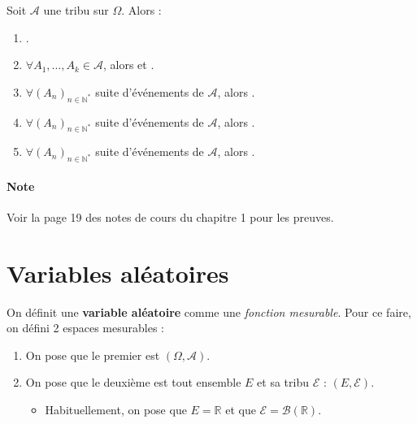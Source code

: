 \documentclass[10pt, french]{report}
\begin{document}
\begin{multicols*}{2}
\begin{definitionNOHFILLprop}
Soit $\mathcal{A}$ une tribu sur $\Omega$. Alors : 
\begin{enumerate}[label = \alph*)]
	\item	{}.
	\item	$\forall A_{1}, \dots, A_{k} \in \mathcal{A}$, alors  et .
	\item	$\forall (A_{n})_{n \in \mathbb{N}^{\ast}}$ suite d'événements de $\mathcal{A}$, alors .
	\item	$\forall (A_{n})_{n \in \mathbb{N}^{\ast}}$ suite d'événements de $\mathcal{A}$, alors .
	\item	$\forall (A_{n})_{n \in \mathbb{N}^{\ast}}$ suite d'événements de $\mathcal{A}$, alors .
\end{enumerate}

\paragraph{Note}	Voir la page 19 des notes de cours du chapitre 1 pour les preuves.
\end{definitionNOHFILLprop}



\columnbreak
\section{Variables aléatoires}

\begin{definitionNOHFILL}
On définit une \textbf{variable aléatoire} comme une \textit{fonction mesurable}. Pour ce faire, on défini 2 espaces mesurables : 
\begin{enumerate}
	\item	On pose que le premier est $(\Omega, \mathcal{A})$.
	\item	On pose que le deuxième est tout ensemble $E$ et sa tribu $\mathcal{E}$ : $(E, \mathcal{E})$.
		\begin{itemize}
		\item	Habituellement, on pose que $E = \mathbb{R}$ et que $\mathcal{E} = \mathcal{B}(\mathbb{R})$.
		\end{itemize}
\end{enumerate}


\end{definitionNOHFILL}
\end{multicols*}
\end{document}
